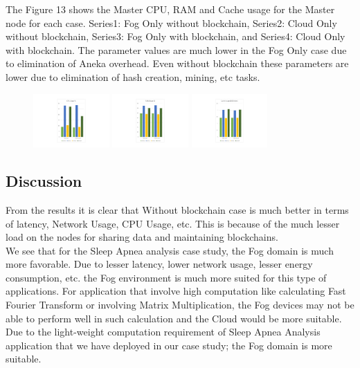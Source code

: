 \documentclass[10pt,journal,compsoc]{IEEEtran}
\begin{document}
The Figure 13 shows the Master CPU, RAM and Cache usage for the Master node for each case. Series1: Fog Only without blockchain, Series2: Cloud Only without blockchain, Series3: Fog Only with blockchain, and Series4: Cloud Only with blockchain. The parameter values are much lower in the Fog Only case due to elimination of Aneka overhead. Even without blockchain these parameters are lower due to elimination of hash creation, mining, etc tasks.
\begin{figure}[h]
\centering
\includegraphics[width=2.9cm]{cpu}
\includegraphics[width=2.9cm]{ram}
\includegraphics[width=2.9cm]{cache}
\end{figure}

\subsection{Discussion}

From the results it is clear that Without blockchain case is much better in terms of latency, Network Usage, CPU Usage, etc. This is because of the much lesser load on the nodes for sharing data and maintaining blockchains.\\ 
We see that for the Sleep Apnea analysis case study, the Fog domain is much more favorable. Due to lesser latency, lower network usage, lesser energy consumption, etc. the Fog environment is much more suited for this type of applications. For application that involve high computation like calculating Fast Fourier Transform or involving Matrix Multiplication, the Fog devices may not be able to perform well in such calculation and the Cloud would be more suitable. Due to the light-weight computation requirement of Sleep Apnea Analysis application that we have deployed in our case study; the Fog domain is more suitable.
\end{document}
